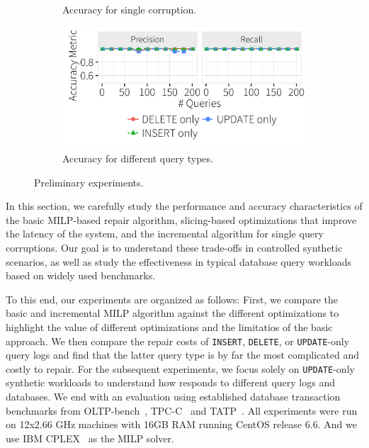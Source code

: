 \begin{figure}[h]
\begin{subfigure}[t]{.33\textwidth}
    \vspace*{-.25in}
    \caption{Accuracy for single corruption.}
    \label{f:singlequeryinc_acc} 
    \end{subfigure}
    \begin{subfigure}[t]{.33\textwidth}
    \includegraphics[width = .99\columnwidth]{figures/indelup_pr}
    \vspace*{-.25in}
    \caption{Accuracy for different query types.}
    \label{f:indelup_acc} 
    \end{subfigure}
    \vspace*{-.15in}
    \caption{Preliminary experiments.}
    \vspace*{-.15in}
  \end{figure}


In this section, we carefully study the performance and accuracy
characteristics of the basic MILP-based repair algorithm, 
slicing-based optimizations that improve the latency of the system, 
and the incremental algorithm for single query corruptions. 
Our goal is to understand these trade-offs in
controlled synthetic scenarios, as well as study the effectiveness
in typical database query workloads based on widely used benchmarks.


To this end, our experiments are organized as follows: First, 
we compare the basic and incremental MILP algorithm against the different optimizations 
to highlight the value of different optimizations and the limitatios of the basic approach.  
We then compare the repair costs of \texttt{INSERT}, \texttt{DELETE}, or \texttt{UPDATE}-only query logs 
and find that the latter query type is by far the most complicated and costly to repair.
For the subsequent experiments, we focus solely on \texttt{UPDATE}-only synthetic workloads 
to understand how \sys responds to different query logs and databases.  
We end with an evaluation using established database transaction benchmarks from OLTP-bench~\cite{difallah2013oltp},
TPC-C~\cite{tpcc} and TATP~\cite{tatp}. 
All experiments were run on 12x2.66 GHz  machines with 16GB RAM running CentOS release 6.6. And we use IBM CPLEX~\cite{cplex2014v12} 
as the MILP solver.




